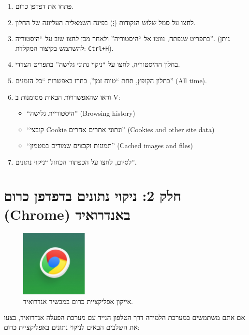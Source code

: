 \documentclass[12pt]{article}
\begin{document}
\begin{enumerate}
    \item פתחו את דפדפן כרום.
    \item לחצו על סמל שלוש הנקודות (\(\vdots\)) בפינה השמאלית העליונה של החלון.
    \item בתפריט שנפתח, נווטו אל \enquote{היסטוריה} ולאחר מכן לחצו שוב על \enquote{היסטוריה}. (ניתן להשתמש בקיצור המקלדת: \texttt{Ctrl+H}).
    \item בחלון ההיסטוריה, לחצו על \enquote{ניקוי נתוני גלישה} בתפריט הצדדי.
    \item בחלון הקופץ, תחת \enquote{טווח זמן}, בחרו באפשרות \enquote{כל הזמנים} (All time).
    \item ודאו שהאפשרויות הבאות מסומנות ב-V:
    \begin{itemize}
        \item \enquote{היסטוריית גלישה} (Browsing history)
        \item \enquote{קובצי Cookie ונתוני אתרים אחרים} (Cookies and other site data)
        \item \enquote{תמונות וקבצים שמורים במטמון} (Cached images and files)
    \end{itemize}
    \item לסיום, לחצו על הכפתור הכחול \enquote{ניקוי נתונים}.
\end{enumerate}

\section*{חלק 2: ניקוי נתונים בדפדפן כרום (Chrome) באנדרואיד}

\begin{figure}[H]
  \centering
  \includegraphics[width=0.3\textwidth]{files/chrome_android_icon.png}
  \caption{אייקון אפליקציית כרום במכשיר אנדרואיד.}
\end{figure}

אם אתם משתמשים במערכת הלמידה דרך הטלפון הנייד עם מערכת הפעלה אנדרואיד, בצעו את השלבים הבאים לניקוי נתונים באפליקציית כרום:
\end{document}
